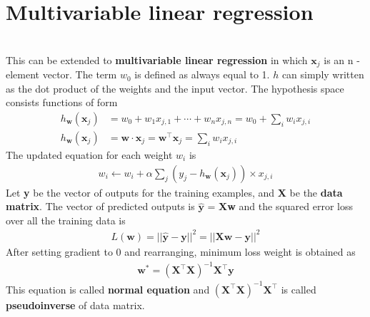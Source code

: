 \documentclass{article}
\begin{document}
\section{Multivariable linear regression}
\begin{paragraph}
\\
This can be extended to \textbf{multivariable linear regression} in which $\textbf{x}_j$ is an n - element vector. The term $w_0$ is defined as always equal to 1. $h$ can simply written as the dot product of the weights and the input vector. The hypothesis space consists functions of form 
\begin{align*}
h_\textbf{w}(\textbf{x}_j) & = w_0 + w_1x_{j,1} + \cdots + w_nx_{j,n} = w_0 + \sum\limits_{i} w_ix_{j,i} \\
h_\textbf{w}(\textbf{x}_j) & = \textbf{w} \cdot \textbf{x}_j = \textbf{w}^\top \textbf{x}_j = \sum\limits_{i} w_ix_{j,i}
\end{align*}
The updated equation for each weight $w_i$ is
\begin{align*}
    w_i \leftarrow w_i + \alpha\sum\limits_{j} (y_j - h_\textbf{w}(\textbf{x}_j)) \times x_{j,i}
\end{align*}
Let \textbf{y} be the vector of outputs for the training examples, and \textbf{X} be the \textbf{data matrix}. The vector of predicted outputs is $\mathbf{\hat{y}}$ = \textbf{Xw} and the squared error loss over all the training data is
\begin{align*}
    L(\textbf{w}) = ||\mathbf{\hat{y}} - \textbf{y}||^2 = ||\textbf{Xw} - \textbf{y}||^2
\end{align*}
After setting gradient to 0 and rearranging, minimum loss weight is obtained as
\begin{align*}
    \textbf{w}^* = (\textbf{X}^\top\textbf{X})^{-1}\textbf{X}^\top\textbf{y}
\end{align*}
This equation is called \textbf{normal equation} and $(\textbf{X}^\top\textbf{X})^{-1}\textbf{X}^\top$ is called \textbf{pseudoinverse} of data matrix.
\end{paragraph}
\end{document}
